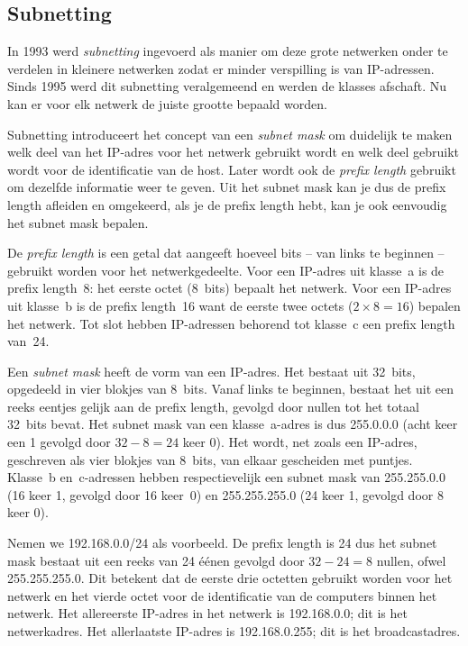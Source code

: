 \subsection{Subnetting}
\label{sec:subnetting}

In 1993 werd \emph{subnetting} ingevoerd als manier om deze grote netwerken onder te verdelen in kleinere netwerken zodat er minder verspilling is van IP-adressen.
Sinds 1995 werd dit subnetting veralgemeend en werden de klasses afschaft.
Nu kan er voor elk netwerk de juiste grootte bepaald worden.

Subnetting introduceert het concept van een \emph{subnet mask} om duidelijk te maken welk deel van het IP-adres voor het netwerk gebruikt wordt en welk deel gebruikt wordt voor de identificatie van de host.
Later wordt ook de \emph{prefix length} gebruikt om dezelfde informatie weer te geven.
Uit het subnet mask kan je dus de prefix length afleiden en omgekeerd, als je de prefix length hebt, kan je ook eenvoudig het subnet mask bepalen.

De \emph{prefix length} is een getal dat aangeeft hoeveel bits -- van links te beginnen -- gebruikt worden voor het netwerkgedeelte.
Voor een IP-adres uit klasse~a is de prefix length~8: het eerste octet (8~bits) bepaalt het netwerk.
Voor een IP-adres uit klasse~b is de prefix length~16 want de eerste twee octets ($2\times 8=16$) bepalen het netwerk.
Tot slot hebben IP-adressen behorend tot klasse~c een prefix length van~24.

Een \emph{subnet mask} heeft de vorm van een IP-adres.
Het bestaat uit 32~bits, opgedeeld in vier blokjes van 8~bits.
Vanaf links te beginnen, bestaat het uit een reeks eentjes gelijk aan de prefix length, gevolgd door nullen tot het totaal 32~bits bevat.
Het subnet mask van een klasse~a-adres is dus 255.0.0.0 (acht keer een 1 gevolgd door $32-8=24$ keer 0).
Het wordt, net zoals een IP-adres, geschreven als vier blokjes van 8~bits, van elkaar gescheiden met puntjes.
Klasse~b en~c-adressen hebben respectievelijk een subnet mask van 255.255.0.0 (16 keer 1, gevolgd door 16 keer~0) en 255.255.255.0 (24 keer 1, gevolgd door 8 keer 0).

Nemen we 192.168.0.0/24 als voorbeeld.
De prefix length is 24 dus het subnet mask bestaat uit een reeks van 24 éénen gevolgd door $32-24=8$ nullen, ofwel 255.255.255.0.
Dit betekent dat de eerste drie octetten gebruikt worden voor het netwerk en het vierde octet voor de identificatie van de computers binnen het netwerk.
Het allereerste IP-adres in het netwerk is 192.168.0.0; dit is het netwerkadres.
Het allerlaatste IP-adres is 192.168.0.255; dit is het broadcastadres.

